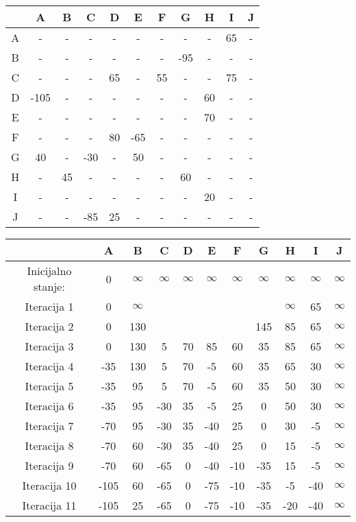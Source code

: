 \documentclass[12pt]{article}
\begin{document}
\begin{tabular}{ | c || c  | c | c | c | c | c | c | c | c | c | }
\hline
 & A & B & C & D & E & F & G & H & I & J\\
 \hline
 \hline
A & - & - & - & - & - & - & - & - & 65 & -\\
 \hline
B & - & - & - & - & - & - & -95 & - & - & -\\
 \hline
C & - & - & - & 65 & - & 55 & - & - & 75 & -\\
 \hline
D & -105 & - & - & - & - & - & - & 60 & - & -\\
 \hline
E & - & - & - & - & - & - & - & 70 & - & -\\
 \hline
F & - & - & - & 80 & -65 & - & - & - & - & -\\
 \hline
G & 40 & - & -30 & - & 50 & - & - & - & - & -\\
 \hline
H & - & 45 & - & - & - & - & 60 & - & - & -\\
 \hline
I & - & - & - & - & - & - & - & 20 & - & -\\
 \hline
J & - & - & -85 & 25 & - & - & - & - & - & -\\
 \hline
\end{tabular}

\hspace{-10cm}

\begin{tabular}{ | c || c  | c | c | c | c | c | c | c | c | c | }
\hline
 & A & B & C & D & E & F & G & H & I & J\\
 \hline
 \hline
Inicijalno stanje:  & 0 & \(\infty\) & \(\infty\) & \(\infty\) & \(\infty\) & \(\infty\) & \(\infty\) & \(\infty\) & \(\infty\) & \(\infty\)\\
 \hline
Iteracija 1 & 0 & \(\infty\) &  &  &  &  &  & \(\infty\) & 65 & \(\infty\)\\
 \hline
Iteracija 2 & 0 & 130 &  &  &  &  & 145 & 85 & 65 & \(\infty\)\\
 \hline
Iteracija 3 & 0 & 130 & 5 & 70 & 85 & 60 & 35 & 85 & 65 & \(\infty\)\\
 \hline
Iteracija 4 & -35 & 130 & 5 & 70 & -5 & 60 & 35 & 65 & 30 & \(\infty\)\\
 \hline
Iteracija 5 & -35 & 95 & 5 & 70 & -5 & 60 & 35 & 50 & 30 & \(\infty\)\\
 \hline
Iteracija 6 & -35 & 95 & -30 & 35 & -5 & 25 & 0 & 50 & 30 & \(\infty\)\\
 \hline
Iteracija 7 & -70 & 95 & -30 & 35 & -40 & 25 & 0 & 30 & -5 & \(\infty\)\\
 \hline
Iteracija 8 & -70 & 60 & -30 & 35 & -40 & 25 & 0 & 15 & -5 & \(\infty\)\\
 \hline
Iteracija 9 & -70 & 60 & -65 & 0 & -40 & -10 & -35 & 15 & -5 & \(\infty\)\\
 \hline
Iteracija 10 & -105 & 60 & -65 & 0 & -75 & -10 & -35 & -5 & -40 & \(\infty\)\\
 \hline
Iteracija 11 & -105 & 25 & -65 & 0 & -75 & -10 & -35 & -20 & -40 & \(\infty\)\\
 \hline
\end{tabular}
\end{document}
